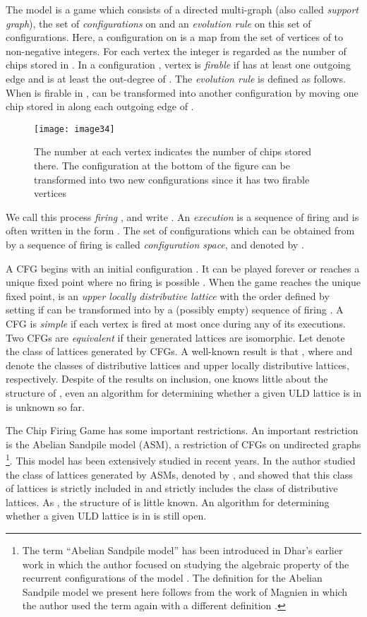 \documentclass{article}
\theoremstyle{definition}
\begin{document}
The model is a game which consists of a directed multi-graph  (also called \emph{support graph}), the set of \emph{configurations} on  and an \emph{evolution rule} on this set of configurations. Here, a configuration  on  is a map from the set  of vertices of  to non-negative integers. For each vertex  the integer  is regarded as the number of chips stored in . In a configuration , vertex  is \emph{firable} if  has at least one outgoing edge and  is at least the out-degree of . The \emph{evolution rule} is defined as follows. When  is firable in ,  can be transformed into another configuration  by moving one chip stored in  along each outgoing edge of . 
\begin{SCfigure} \centering
\texttt{[image: image34]}
  \caption{The number at each vertex indicates the number of chips stored there. The configuration at the bottom of the figure can be transformed into two new configurations since it has two firable vertices}
  \label{fig:image34}
\end{SCfigure}
We call this process \emph{firing }, and write . An \emph{execution} is a sequence of firing and is often written in the form . The set of configurations which can be obtained from  by a sequence of firing is called \emph{configuration space}, and denoted by . 

A CFG begins with an initial configuration . It can be played forever or reaches a unique fixed point where no firing is possible \cite{Eri93}. When the game reaches the unique fixed point,  is an \emph{upper locally distributive lattice} with the order defined by setting  if  can be transformed into  by a (possibly empty) sequence of firing  \cite{LP01}. A CFG is \emph{simple} if each vertex is fired at most once during any of its executions. Two CFGs are \emph{equivalent} if their generated lattices are isomorphic. Let  denote the class of lattices generated by CFGs. A well-known result is that   \cite{MVP01}, where  and  denote the classes of distributive lattices and upper locally distributive lattices, respectively. Despite of the results on inclusion, one knows little about the structure of , even an algorithm for determining whether a given ULD lattice is in  is unknown so far.

The Chip Firing Game has some important restrictions. An important restriction is the Abelian Sandpile model (ASM), a restriction of CFGs on undirected graphs  \cite{Mag03,BTW87,BLS91}\footnote{The term ``Abelian Sandpile model'' has been introduced in Dhar's earlier work in which the author focused on studying the algebraic property of the recurrent configurations of the model \cite{Dha90}. The definition for the Abelian Sandpile model we present here follows from the work of Magnien in which the author used the term again with a different definition \cite{Mag03}.}. This model has been extensively studied in recent years. In \cite{Mag03} the author studied the class of lattices generated by ASMs, denoted by , and showed that this class of lattices is strictly included in  and strictly includes the class of distributive lattices. As , the structure of  is little known. An algorithm for determining whether a given ULD lattice is in  is still open.
\end{document}
